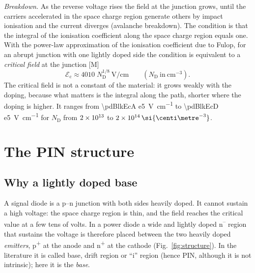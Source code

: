 \documentclass[10pt,a4paper]{scrartcl}
\newcommand{\Ec}{\mathcal{E}_\mathrm{c}}      %
\newcommand{\ND}{N_\mathrm{D}}
\newcommand{\Pp}{p\textsuperscript{+}}
\newcommand{\Nm}{n\textsuperscript{--}}
\newcommand{\Np}{n\textsuperscript{+}}
\newcommand{\cmc}{\si{\centi\metre^{-3}}}
\begin{document}
\emph{Breakdown.} As the reverse voltage rises the field at the junction grows, until the carriers accelerated in the space charge region generate others by impact ionisation and the current diverges (avalanche breakdown). The condition is that the integral of the ionisation coefficient along the space charge region equals one. With the power-law approximation of the ionisation coefficient due to Fulop, for an abrupt junction with one lightly doped side the condition is equivalent to a \emph{critical field} at the junction [M]~\cite{baliga}
\begin{equation}
\Ec \approx 4010\;\ND^{1/8}\ \si{\volt\per\centi\metre} \qquad (\ND\ \text{in}\ \cmc) .
\label{eq:ecrit}
\end{equation}
The critical field is not a constant of the material: it grows weakly with the doping, because what matters is the integral along the path, shorter where the doping is higher. It ranges from \SI{\pdBlkEcA e5}{\volt\per\centi\metre} to \SI{\pdBlkEcD e5}{\volt\per\centi\metre} for $\ND$ from $2\times10^{13}$ to $\pdBlkNdD\,\cmc$.

\section{The PIN structure}
\label{sec:pin}
\subsection{Why a lightly doped base}
\label{sec:why}
A signal diode is a p--n junction with both sides heavily doped. It cannot sustain a high voltage: the space charge region is thin, and the field reaches the critical value at a few tens of volts. In a power diode a wide and lightly doped \Nm{} region that sustains the voltage is therefore placed between the two heavily doped \emph{emitters}, \Pp{} at the anode and \Np{} at the cathode (Fig.~\ref{fig:structure}). In the literature it is called base, drift region or ``i'' region (hence PIN, although it is not intrinsic); here it is the \emph{base}.
\end{document}

